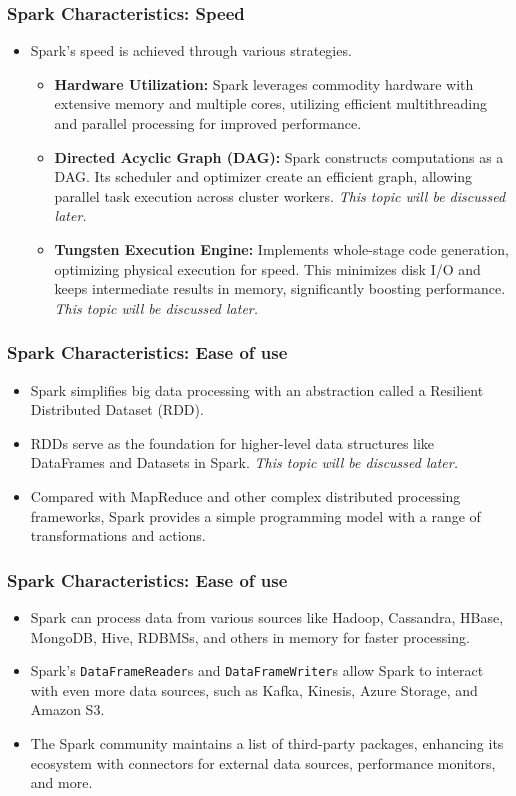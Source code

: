 \begin{frame}
    \frametitle{Spark Characteristics: Speed}
    \begin{itemize}
        \item Spark's speed is achieved through various strategies.
        \begin{itemize}
            \item \textbf{Hardware Utilization:} Spark leverages commodity hardware with extensive memory and multiple cores, utilizing efficient multithreading and parallel processing for improved performance.
            \item \textbf{Directed Acyclic Graph (DAG):} Spark constructs computations as a DAG. Its scheduler and optimizer create an efficient graph, allowing parallel task execution across cluster workers. \textit{\color{blue}This topic will be discussed later.}
            \item \textbf{Tungsten Execution Engine:} Implements whole-stage code generation, optimizing physical execution for speed. This minimizes disk I/O and keeps intermediate results in memory, significantly boosting performance. \textit{\color{blue}This topic will be discussed later.}
        \end{itemize}
    \end{itemize}

\end{frame}


\begin{frame}
    \frametitle{Spark Characteristics: Ease of use}
    \begin{itemize}
        \item Spark simplifies big data processing with an abstraction called a Resilient Distributed Dataset (RDD).\pause
        \item RDDs serve as the foundation for higher-level data structures like DataFrames and Datasets in Spark. \textit{\color{blue}This topic will be discussed later.}\pause
        \item Compared with MapReduce and other complex distributed processing frameworks, Spark provides a simple programming model with a range of transformations and actions. \pause
    \end{itemize}
\end{frame}

\begin{frame}
    \frametitle{Spark Characteristics: Ease of use}
    \begin{itemize}
        \item Spark can process data from various sources like Hadoop, Cassandra, HBase, MongoDB, Hive, RDBMSs, and others in memory for faster processing.
        \item Spark's \texttt{DataFrameReader}s and \texttt{DataFrameWriter}s allow Spark to interact with even more data sources, such as Kafka, Kinesis, Azure Storage, and Amazon S3.
        \item The Spark community maintains a list of third-party packages, enhancing its ecosystem with connectors for external data sources, performance monitors, and more.
    \end{itemize}
\end{frame}

